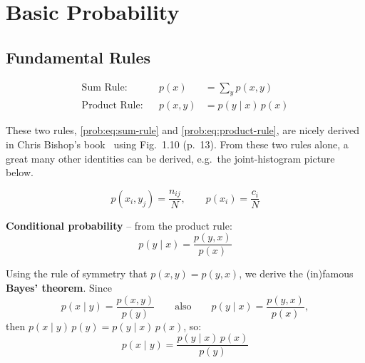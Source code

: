 \chapter{Basic Probability}
\label{prob:basic-probability}


\section{Fundamental Rules}
\label{prob:sec:fundamental-rules}

\begin{align}
\text{Sum Rule:} && p(x) &= \sum_{y} p(x,y) \label{prob:eq:sum-rule} \\
\text{Product Rule:} && p(x,y) &= p(y\mid x)\,p(x) \label{prob:eq:product-rule}
\end{align}

\noindent
These two rules, \eqref{prob:eq:sum-rule} and \eqref{prob:eq:product-rule}, are nicely derived in Chris Bishop's book~\cite{bishop2006prml} using Fig.\ 1.10 (p.\ 13). From these two rules alone, a great many other identities can be derived, e.g.\ the joint-histogram picture below.

\begin{center}
\end{center}
\[
p(x_i,y_j) = \frac{n_{ij}}{N}, \qquad p(x_i) = \frac{c_i}{N}
\]

\noindent
\textbf{Conditional probability} -- from the product rule:
\[
p(y\mid x) = \frac{p(y,x)}{p(x)}
\]

\noindent
Using the rule of symmetry that $p(x,y) = p(y,x)$, we derive the (in)famous \textbf{Bayes' theorem}. Since
\[
p(x\mid y) = \frac{p(x,y)}{p(y)}
\qquad \text{also} \qquad
p(y\mid x) = \frac{p(y,x)}{p(x)},
\]
then $p(x\mid y)\,p(y) = p(y\mid x)\,p(x)$, so:
\begin{equation}
\boxed{\,p(x\mid y) = \dfrac{p(y\mid x)\,p(x)}{p(y)}\,}
\label{prob:eq:bayes}
\end{equation}

